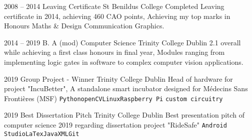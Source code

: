 \documentclass[9pt]{developercv} %
\begin{document}


\begin{entrylist}
	\entry
		{2008 -- 2014}
		{Leaving Certificate}
		{St Benildus College}
		{Completed Leaving certificate in 2014, achieving 460 CAO points, Achieving my top marks in Honours Maths \& Design Communication Graphics.}

	\entry
		{2014 -- 2019}
		{B. A (mod) Computer Science}
		{Trinity College Dublin}
		{2.1 overall while achieving a first class honours in final year, Modules ranging from implementing logic gates in software to complex computer vision applications.}
	
\end{entrylist}








\begin{entrylist}
	\entry
		{2019}
		{Group Project - Winner}
		{Trinity College Dublin}
		{Head of hardware for project "IncuBetter", A standalone smart incubator designed for Médecins Sans Frontières (MSF)   \texttt{Python}\slashsep\texttt{openCV}\slashsep\texttt{Linux}\slashsep\texttt{Raspberry Pi} \slashsep\texttt{custom circuitry}}


	\entry
		{2019}
		{Best Dissertation Pitch}
		{Trinity College Dublin}
		{Best presentation pitch of computer science 2019 regarding dissertation project "RideSafe"  \texttt{Android Studio}\slashsep\texttt{LaTex}\slashsep\texttt{Java}\slashsep\texttt{XML}\slashsep\texttt{Git}}
	
\end{entrylist}



\end{document}
